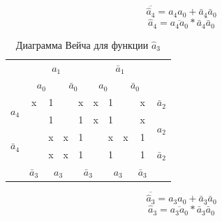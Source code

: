\documentclass[a4paper,14pt]{article}
\begin{document}
$$\overline{\hat{a}_4} = a_4 a_0 + \bar{a}_4\bar{a}_0$$
$$\hat{a}_4 = \overline{a_4 a_0} * \overline{\bar{a}_4\bar{a}_0}$$


\begin{table}[H]
				\begin{center}
		\caption{\label{tab:a3_preobr} Диаграмма Вейча для функции $\hat{a}_3$}


	\begin{tabular}{cccccccccc}
		& \multicolumn{4}{c}{$a_1$} & \multicolumn{4}{c}{$\bar{a}_1$} &  \\
		& \multicolumn{2}{c}{$a_0$} & \multicolumn{2}{c}{$\bar{a}_0$} & \multicolumn{2}{c}{$a_0$} & \multicolumn{2}{c}{$\bar{a}_0$} &  \\ \cline{2-9}
		\multicolumn{1}{c|}{\multirow{2}{*}{$a_4$}} & \multicolumn{1}{c|}{x} & \multicolumn{1}{c|}{1} & \multicolumn{1}{c|}{} & \multicolumn{1}{c|}{x} & \multicolumn{1}{c|}{x} & \multicolumn{1}{c|}{1} & \multicolumn{1}{c|}{} & \multicolumn{1}{c|}{x} & $\bar{a}_2$ \\ \cline{2-9}
		\multicolumn{1}{c|}{} & \multicolumn{1}{c|}{} & \multicolumn{1}{c|}{1} & \multicolumn{1}{c|}{} & \multicolumn{1}{c|}{1} & \multicolumn{1}{c|}{x} & \multicolumn{1}{c|}{1} & \multicolumn{1}{c|}{} & \multicolumn{1}{c|}{x} & \multirow{2}{*}{$a_2$} \\ \cline{2-9}
		\multicolumn{1}{c|}{\multirow{2}{*}{$\bar{a}_4$}} & \multicolumn{1}{c|}{} & \multicolumn{1}{c|}{x} & \multicolumn{1}{c|}{x} & \multicolumn{1}{c|}{1} & \multicolumn{1}{c|}{} & \multicolumn{1}{c|}{x} & \multicolumn{1}{c|}{x} & \multicolumn{1}{c|}{1} &  \\ \cline{2-9}
		\multicolumn{1}{c|}{} & \multicolumn{1}{c|}{} & \multicolumn{1}{c|}{x} & \multicolumn{1}{c|}{x} & \multicolumn{1}{c|}{1} & \multicolumn{1}{c|}{} & \multicolumn{1}{c|}{1} & \multicolumn{1}{c|}{} & \multicolumn{1}{c|}{1} & $\bar{a}_2$ \\ \cline{2-9}
		& $\bar{a}_3$ & \multicolumn{2}{c}{$a_3$} & \multicolumn{2}{c}{$\bar{a}_3$} & \multicolumn{2}{c}{$a_3$} & $\bar{a}_3$ & 
	\end{tabular}
\end{center}
\end{table}

$$\overline{\hat{a}_3} = a_3 a_0 + \bar{a}_3\bar{a}_0$$
$$\hat{a}_3 = \overline{a_3 a_0} * \overline{\bar{a}_3\bar{a}_0}$$


\end{document}

